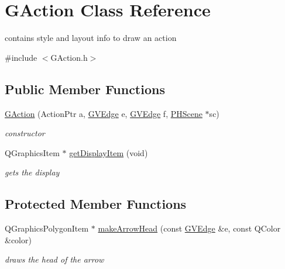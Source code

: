 \hypertarget{class_g_action}{\section{\-G\-Action \-Class \-Reference}
\label{class_g_action}
}


contains style and layout info to draw an action  




{\ttfamily \#include $<$\-G\-Action.\-h$>$}

\subsection*{\-Public \-Member \-Functions}
\begin{DoxyCompactItemize}
\item 
\hyperlink{class_g_action_a697f4b533d191139a1eb401c486afff9}{\-G\-Action} (\-Action\-Ptr a, \hyperlink{struct_g_v_edge}{\-G\-V\-Edge} e, \hyperlink{struct_g_v_edge}{\-G\-V\-Edge} f, \hyperlink{class_p_h_scene}{\-P\-H\-Scene} $\ast$sc)
\begin{DoxyCompactList}\small\item\em constructor \end{DoxyCompactList}\item 
\-Q\-Graphics\-Item $\ast$ \hyperlink{class_g_action_ad3086cca158b494f7c2fd31783fb9f77}{get\-Display\-Item} (void)
\begin{DoxyCompactList}\small\item\em gets the display \end{DoxyCompactList}\end{DoxyCompactItemize}
\subsection*{\-Protected \-Member \-Functions}
\begin{DoxyCompactItemize}
\item 
\-Q\-Graphics\-Polygon\-Item $\ast$ \hyperlink{class_g_action_afeb408bf85d902191cef8a3cf613c7eb}{make\-Arrow\-Head} (const \hyperlink{struct_g_v_edge}{\-G\-V\-Edge} \&e, const \-Q\-Color \&color)
\begin{DoxyCompactList}\small\item\em draws the head of the arrow \end{DoxyCompactList}\end{DoxyCompactItemize}
